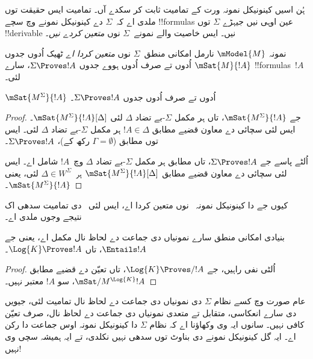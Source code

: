 \documentclass[../../../include/open-logic-section]{subfiles}
\begin{document}


ہُن اسیں کینونیکل نمونہ ورت کے تمامیت ثابت کر سکدے آں۔ تمامیت ایس حقیقت توں ملدی اے کہ~$\Sigma$ دے کینونیکل نمونے وچ سچے !!{formula}s عین اوہی نیں جیہڑے $\Sigma$ توں !!{derivable} نیں۔ ایس خاصیت والے نمونے~$\Sigma$ نوں \emph{متعین کردے نیں}۔

\begin{defn}
  نمونہ $\mModel{M}$ نارمل امکانی منطق~$\Sigma$ نوں \emph{متعین کردا اے} ٹھیک اُدوں جدوں $\mSat{M}{!A}$ اُدوں تے صرف اُدوں ہووے جدوں $\Sigma
  \Proves !A$، سارے !!{formula}s~$!A$ لئی۔
\end{defn}

\begin{thm}[تعیّن]
   $\mSat{M^\Sigma}{!A}$ اُدوں تے صرف اُدوں جدوں $\Sigma \Proves !A$۔
\end{thm}

\begin{proof}
  جے $\mSat{M^\Sigma}{!A}$، تاں ہر مکمل
  $\Sigma$-بے تضاد $\Delta$ لئی
  $\mSat{M^\Sigma}{!A}[\Delta]$۔ ایس لئی سچائی دے معاون قضیے مطابق $!A \in
  \Delta$ ہر مکمل $\Sigma$-بے تضاد $\Delta$ لئی۔ ایس توں
   مطابق ($\Gamma =
  \emptyset$ رکھ کے)، $\Sigma \Proves !A$۔

  اُلٹے پاسے جے $\Sigma \Proves !A$، تاں
   مطابق ہر مکمل $\Sigma$-بے تضاد $\Delta$ وچ~$!A$ شامل اے۔ ایس لئی سچائی دے معاون قضیے مطابق
  $\mSat{M^\Sigma}{!A}[\Delta]$ ہر~$\Delta \in
  W^\Sigma$ لئی، یعنی $\mSat{M^\Sigma}{!A}$۔
\end{proof}

کیوں جے  دا کینونیکل نمونہ~ نوں متعین کردا اے، ایس لئی~ دی تمامیت سدھی اک نتیجے وجوں ملدی اے۔

\begin{cor}
  بنیادی امکانی منطق  سارے نمونیاں دی جماعت دے لحاظ نال مکمل اے، یعنی جے $\Entails !A$، تاں $\Log{K}
  \Proves !A$۔
\end{cor}

\begin{proof}
  اُلٹی نفی راہیں، جے $\Log{K} \Proves/ !A$، تاں تعیّن دے قضیے مطابق
  $\mSat/{M^{\Log{K}}}{!A}$، سو $!A$ معتبر نہیں۔
\end{proof}

عام صورت وچ کسے نظام $\Sigma$ دی نمونیاں دی جماعت دے لحاظ نال تمامیت لئی، جیویں  دی سارے انعکاسی، متقابل تے متعدی نمونیاں دی جماعت دے لحاظ نال، صرف تعیّن کافی نہیں۔ سانوں ایہ وی وکھاؤنا اے کہ نظام
$\Sigma$ دا کینونیکل نمونہ اوس جماعت دا رکن اے۔ ایہ گل کینونیکل نمونے دی بناوٹ توں سدھی نہیں نکلدی، تے ایہ ہمیشہ سچی وی نہیں!
\end{document}
